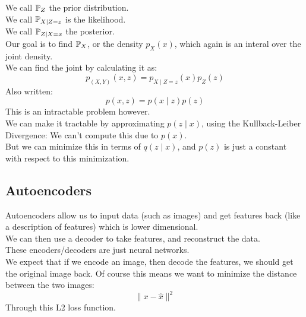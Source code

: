 \documentclass[12pt]{article}
\begin{document}
We call $\mathbb{P}_Z$ the prior distribution. \\

We call $\mathbb{P}_{X \mid Z = z}$ is the likelihood. \\

We call $\mathbb{P}_{Z \mid X = x}$ the posterior. \\

Our goal is to find $\mathbb{P}_X$, or the density
$p_X(x)$, which again is an interal
over the joint density. \\
We can find the joint by calculating it as:
\[ p_{(X, Y)}(x, z) = p_{X \mid Z = z}(x)p_Z(z) \]
Also written:
\[ p(x, z) = p(x \mid z)p(z) \]
This is an intractable problem however. \\

We can make it tractable by approximating
$p(z \mid x)$, using the Kullback-Leiber Divergence:
We can't compute this due to $p(x)$. \\
But we can minimize this in terms of $q(z \mid x)$,
and $p(z)$ is just a constant with respect to
this minimization. \\

\newpage

\subsection*{Autoencoders}

Autoencoders allow us to input data (such as images)
and get features back (like a description of
features) which is lower dimensional. \\

We can then use a decoder to take features, 
and reconstruct the data. \\

These encoders/decoders are just neural networks. \\

We expect that if we encode an image, then decode
the features, we should get the original image
back. Of course this means we want to minimize 
the distance between the two images:
\[ \|x - \hat{x}\|^2 \]
Through this L2 loss function. \\
\end{document}
